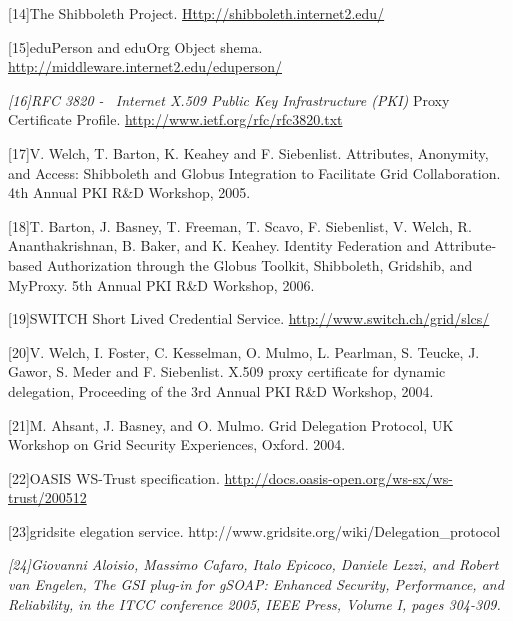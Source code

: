 \documentclass{article}
\newcommand\textstyleCitation[1]{\textit{#1}}
\begin{document}
[14]The Shibboleth Project.
\href{http://shibboleth.internet2.edu/}{Http://shibboleth.internet2.edu/}

[15]eduPerson and eduOrg Object shema.
\url{http://middleware.internet2.edu/eduperson/}

\textstyleCitation{\textup{[16]RFC 3820 - \ Internet X.509 Public Key
Infrastructure (PKI)}} Proxy Certificate Profile.
\url{http://www.ietf.org/rfc/rfc3820.txt}

[17]V. Welch, T. Barton, K. Keahey and F. Siebenlist. Attributes,
Anonymity, and Access: Shibboleth and Globus Integration to Facilitate
Grid Collaboration. 4th Annual PKI R\&D Workshop, 2005. 

[18]T. Barton, J. Basney, T. Freeman, T. Scavo, F. Siebenlist, V. Welch,
R. Ananthakrishnan, B. Baker, and K. Keahey. Identity Federation and
Attribute-based Authorization through the Globus Toolkit, Shibboleth,
Gridshib, and MyProxy. 5th Annual PKI R\&D Workshop, 2006. 

[19]SWITCH Short Lived Credential Service.
\url{http://www.switch.ch/grid/slcs/}

[20]V. Welch, I. Foster, C. Kesselman, O. Mulmo, L. Pearlman, S. Teucke,
J. Gawor, S. Meder and F. Siebenlist. X.509 proxy certificate for
dynamic delegation, Proceeding of the 3rd Annual PKI R\&D Workshop,
2004.

[21]M. Ahsant, J. Basney, and O. Mulmo. Grid Delegation Protocol, UK
Workshop on Grid Security Experiences, Oxford. 2004.

[22]OASIS WS-Trust specification.
\url{http://docs.oasis-open.org/ws-sx/ws-trust/200512}

[23]gridsite elegation service.
http://www.gridsite.org/wiki/Delegation\_protocol

\textstyleCitation{\textup{[24]}}\textstyleCitation{\textup{Giovanni
Aloisio, Massimo Cafaro, Italo Epicoco, Daniele Lezzi, and Robert van
Engelen, The GSI plug-in for gSOAP: Enhanced Security, Performance, and
Reliability, in the ITCC conference 2005, IEEE Press, Volume I, pages
304-309.}}


\bigskip


\bigskip


\bigskip


\bigskip


\bigskip
\end{document}
